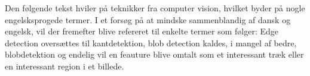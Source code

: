\textsf{
Den følgende tekst hviler på teknikker fra computer vision, hvilket byder
på nogle engelsksprogede termer. I et forsøg på at mindske sammenblandig
af dansk og engelsk, vil der fremefter blive refereret til enkelte termer
som følger: Edge detection oversættes til kantdetektion, blob detection
kaldes, i mangel af bedre, blobdetektion og endelig vil en feauture blive
omtalt som et interessant træk eller en interessant region i et billede.
}
